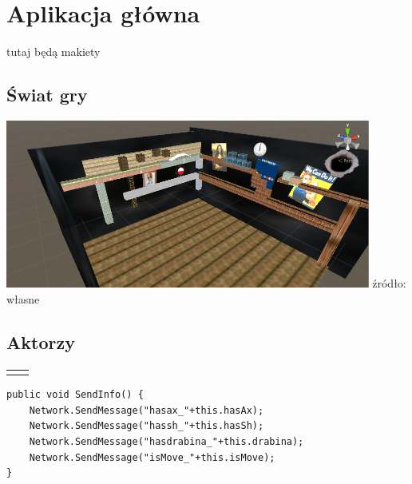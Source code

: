 \newpage
\section{Aplikacja główna}


{\color{red}tutaj będą makiety}

\subsection{Świat gry}

\begin{center}
\includegraphics[width=0.9\textwidth]{images/swiatgry.png}
\small {źródło: własne }
\end{center}


\subsection{Aktorzy}
\paragraph{}


\begin{center}

 \begin{tabular}{|c|c|}
 \hline  
  &   \\
  \hline   
  &   \\
  \hline   
\end{tabular}
\end{center}

\begin{lstlisting}[language=CSharp]
public void SendInfo() {
	Network.SendMessage("hasax_"+this.hasAx);
	Network.SendMessage("hassh_"+this.hasSh);
	Network.SendMessage("hasdrabina_"+this.drabina);
	Network.SendMessage("isMove_"+this.isMove);
}
\end{lstlisting}

